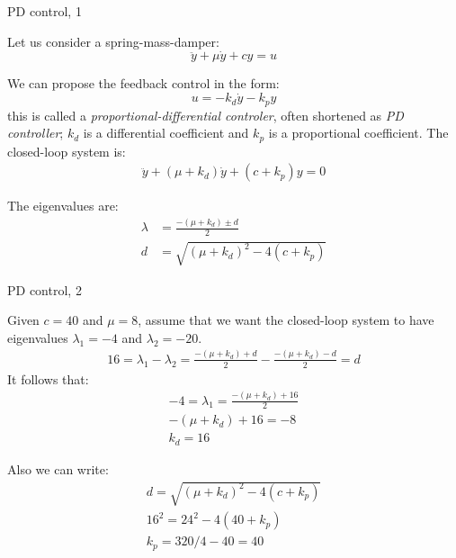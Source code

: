 \documentclass{beamer}
\begin{document}
\begin{frame}{PD control, 1}
	\begin{flushleft}
		
		Let us consider a spring-mass-damper:
		\begin{equation}
			\ddot y + \mu \dot y + c y = u
		\end{equation}
		
		We can propose the feedback control in the form:
		\begin{equation}
			u = -k_d \dot y  -k_p y 
		\end{equation}
		this is called a \emph{proportional-differential controler}, often shortened as \emph{PD controller}; $k_d$ is a differential coefficient and $k_p$ is a proportional coefficient. The closed-loop system is:
		\begin{align}
			\ddot y + (\mu + k_d) \dot y + (c+k_p) y = 0
		\end{align}
		
		The eigenvalues are:
		\begin{align}
			\lambda &= \frac{-(\mu + k_d) \pm d}{2} 
			\\
			d &= \sqrt{(\mu + k_d)^2 - 4 (c+k_p)}
		\end{align}
		
		
	\end{flushleft}
\end{frame}



\begin{frame}{PD control, 2}
	\begin{flushleft}
		
		Given $c = 40$ and $\mu = 8$, assume that we want the closed-loop system to have eigenvalues $\lambda_1 = -4$ and $\lambda_2 = -20$.
		\begin{align}
			16 = \lambda_1 - \lambda_2= \frac{-(\mu + k_d) +d}{2} - \frac{-(\mu + k_d) - d}{2}  = d
		\end{align}
		It follows that:
		\begin{align}
			-4 = \lambda_1 = \frac{-(\mu + k_d) + 16}{2}
			\\
			-(\mu + k_d) + 16 = -8
			\\
			k_d  = 16
		\end{align}
		
		
		Also we can write:
		\begin{align}
			d = \sqrt{(\mu + k_d)^2 - 4 (c+k_p)}
			\\
			16^2 = 24^2 - 4 (40 + k_p)
			\\
			k_p = 320 / 4 - 40 = 40
		\end{align}
		
		
	\end{flushleft}
\end{frame}
\end{document}
